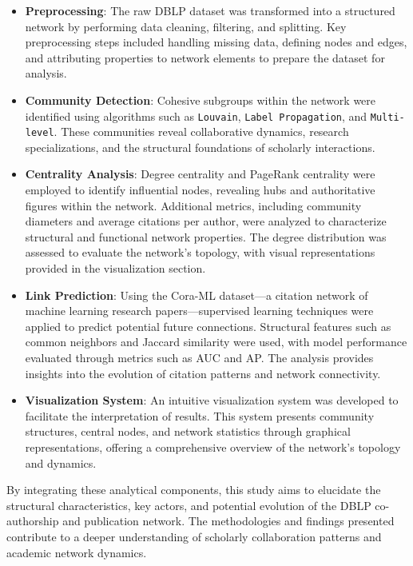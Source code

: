 \documentclass[11pt]{article}
\begin{document}
\begin{itemize}
    \item \textbf{Preprocessing}: The raw DBLP dataset was transformed into a structured network by performing data cleaning, filtering, and splitting. Key preprocessing steps included handling missing data, defining nodes and edges, and attributing properties to network elements to prepare the dataset for analysis.
    \item \textbf{Community Detection}: Cohesive subgroups within the network were identified using algorithms such as \texttt{Louvain}, \texttt{Label Propagation}, and \texttt{Multi-level}. These communities reveal collaborative dynamics, research specializations, and the structural foundations of scholarly interactions.
    \item \textbf{Centrality Analysis}: Degree centrality and PageRank centrality were employed to identify influential nodes, revealing hubs and authoritative figures within the network. Additional metrics, including community diameters and average citations per author, were analyzed to characterize structural and functional network properties. The degree distribution was assessed to evaluate the network's topology, with visual representations provided in the visualization section.
    \item \textbf{Link Prediction}: Using the Cora-ML dataset—a citation network of machine learning research papers—supervised learning techniques were applied to predict potential future connections. Structural features such as common neighbors and Jaccard similarity were used, with model performance evaluated through metrics such as AUC and AP. The analysis provides insights into the evolution of citation patterns and network connectivity.
    \item \textbf{Visualization System}: An intuitive visualization system was developed to facilitate the interpretation of results. This system presents community structures, central nodes, and network statistics through graphical representations, offering a comprehensive overview of the network's topology and dynamics.
\end{itemize}

By integrating these analytical components, this study aims to elucidate the structural characteristics, key actors, and potential evolution of the DBLP co-authorship and publication network. The methodologies and findings presented contribute to a deeper understanding of scholarly collaboration patterns and academic network dynamics.
\end{document}
